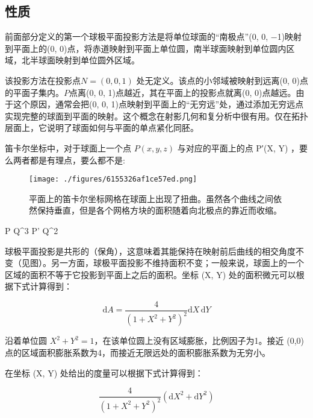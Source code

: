 \subsection{性质}
前面部分定义的第一个球极平面投影方法是将单位球面的“南极点”(0, 0, −1)映射到平面上的(0, 0)点，将赤道映射到平面上单位圆，南半球面映射到单位圆内区域，北半球面映射到单位圆外区域。

该投影方法在投影点$N = (0, 0, 1)$ 处无定义。该点的小邻域被映射到远离(0, 0)点的平面子集内。$P$点离(0, 0, 1)点越近，其在平面上的投影点就离(0, 0)点越远。由于这个原因，通常会把(0, 0, 1)点映射到平面上的“无穷远”处，通过添加无穷远点实现完整的球面到平面的映射。这个概念在射影几何和复分析中很有用。仅在拓扑层面上，它说明了球面如何与平面的单点紧化同胚。

笛卡尔坐标中，对于球面上一个点 $P(x, y, z)$ 与对应的平面上的点 P′(X, Y) ，要么两者都是有理点，要么都不是:
\begin{figure}[ht]
\centering
\texttt{[image: ./figures/6155326af1ce57ed.png]}
\caption{平面上的笛卡尔坐标网格在球面上出现了扭曲。虽然各个曲线之间依然保持垂直，但是各个网格方块的面积随着向北极点的靠近而收缩。} \label{fig_QJPMTY_6}
\end{figure}
P \in Q^3 \Longleftrightarrow P' \in Q^2

球极平面投影是共形的（保角），这意味着其能保持在映射前后曲线的相交角度不变（见图）。另一方面，球极平面投影不维持面积不变；一般来说，球面上的一个区域的面积不等于它投影到平面上之后的面积。坐标 (X, Y) 处的面积微元可以根据下式计算得到：

$$
\mathrm{d}A = \frac{4}{(1 + X^2 + Y^2)^2} \mathrm{d}X \, \mathrm{d}Y
$$

沿着单位圆 \(X^2 + Y^2 = 1\)，在该单位圆上没有区域膨胀，比例因子为1。接近 (0,0) 点的区域面积膨胀系数为4，而接近无限远处的面积膨胀系数为无穷小。

在坐标 (X, Y) 处给出的度量可以根据下式计算得到：

$$
\frac{4}{(1 + X^2 + Y^2)^2} (\mathrm{d}X^2 + \mathrm{d}Y^2)
$$